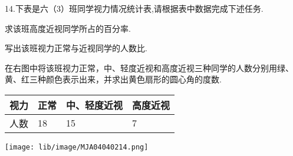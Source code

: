 14.下表是六（3）班同学视力情况统计表,请根据表中数据完成下述任务.

\begin{subquestions}

    \subquestion 求该班高度近视同学所占的百分率.

    \subquestion 写出该班视力正常与近视同学的人数比.

    \subquestion 在右图中将该班视力正常，中、轻度近视和高度近视三种同学的人数分别用绿、黄、红三种颜色表示出来，并求出黄色扇形的圆心角的度数.

\end{subquestions}

\begin{center}

    \begin{tabular}{|p{2cm}<{\centering}|p{2cm}<{\centering}|p{3cm}<{\centering}|p{3cm}<{\centering}|}

         \hline

         视力&正常&中、轻度近视&高度近视 \\

         \hline

        人数&18&15&7 \\

        \hline

    \end{tabular}

\end{center}

\begin{center}

    \texttt{[image: lib/image/MJA04040214.png]}

\end{center}



